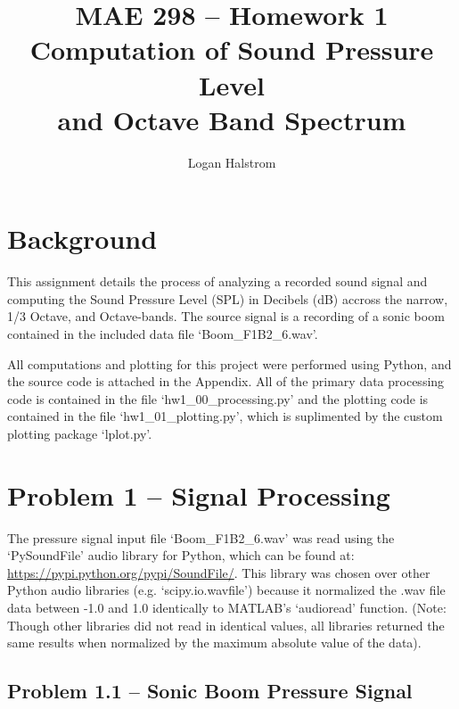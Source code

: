 \documentclass[twocolumn,10pt]{asme2ej}
\title{MAE 298 -- Homework 1\\Computation of Sound Pressure Level\\and Octave Band Spectrum}
\author{Logan Halstrom
    \affiliation{
	PhD Graduate Student Researcher\\
	Center for Human/Robot/Vehicle Integration and Performance\\
	Department of Mechanical and Aerospace Engineering\\
	University of California, Davis\\
    Email: ldhalstrom@ucdavis.edu
    }
}
\newcommand\linkcolor{blue} %
\begin{document}
\maketitle


\newcommand\pictype{pdf}  %
\newcommand\picdir{../Plots} %



\section{Background}

This assignment details the process of analyzing a recorded sound signal and computing the Sound Pressure Level (SPL) in Decibels (dB) accross the narrow, 1/3 Octave, and Octave-bands.  The source signal is a recording of a sonic boom contained in the included data file `Boom\_F1B2\_6.wav'.

All computations and plotting for this project were performed using Python, and the source code is attached in the Appendix.  All of the primary data processing code is contained in the file `hw1\_00\_processing.py' and the plotting code is contained in the file `hw1\_01\_plotting.py', which is suplimented by the custom plotting package `lplot.py'.

\section{Problem 1 -- Signal Processing}

The pressure signal input file `Boom\_F1B2\_6.wav' was read using the `PySoundFile' audio library for Python, which can be found at: \textcolor{\linkcolor}{\url{https://pypi.python.org/pypi/SoundFile/}}.  This library was chosen over other Python audio libraries (e.g. `scipy.io.wavfile') because it normalized the .wav file data between -1.0 and 1.0 identically to MATLAB's `audioread' function.  (Note: Though other libraries did not read in identical values, all libraries returned the same results when normalized by the maximum absolute value of the data).


\subsection{Problem 1.1 -- Sonic Boom Pressure Signal}
\end{document}

